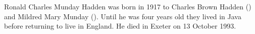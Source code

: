 
Ronald Charles Munday Hadden was born in 1917 to Charles Brown Hadden () and Mildred Mary Munday (). Until he was four years old they lived in Java before returning to live in England. 
He died in Exeter on 13 October 1993.\cite{RCMHaddenDeath}
